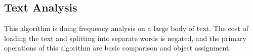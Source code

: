 \subsection{Text Analysis}
This algorithm is doing frequency analysis on a large body of text.  The cost of loading the text and splitting into separate words is negated, and the primary operations of this algorithm are basic comparison and object assignment.
 